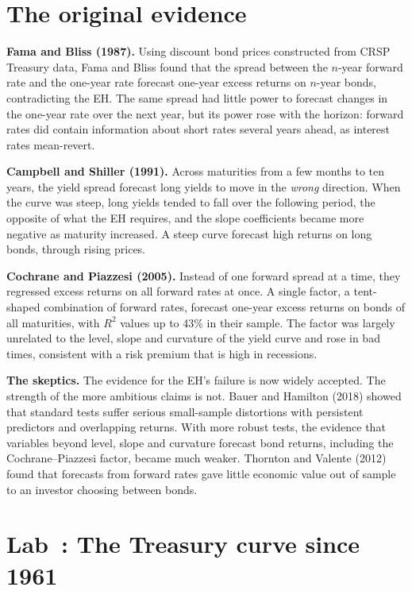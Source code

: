 \section{The original evidence}
\label{sec:10-evidence}

\textbf{Fama and Bliss (1987).} Using discount bond prices constructed from CRSP Treasury data, Fama and Bliss found that the spread between the $n$-year forward rate and the one-year rate forecast one-year excess returns on $n$-year bonds, contradicting the EH. The same spread had little power to forecast changes in the one-year rate over the next year, but its power rose with the horizon: forward rates did contain information about short rates several years ahead, as interest rates mean-revert.

\textbf{Campbell and Shiller (1991).} Across maturities from a few months to ten years, the yield spread forecast long yields to move in the \emph{wrong} direction. When the curve was steep, long yields tended to fall over the following period, the opposite of what the EH requires, and the slope coefficients became more negative as maturity increased. A steep curve forecast high returns on long bonds, through rising prices.

\textbf{Cochrane and Piazzesi (2005).} Instead of one forward spread at a time, they regressed excess returns on all forward rates at once. A single factor, a tent-shaped combination of forward rates, forecast one-year excess returns on bonds of all maturities, with $R^2$ values up to 43\% in their sample. The factor was largely unrelated to the level, slope and curvature of the yield curve and rose in bad times, consistent with a risk premium that is high in recessions.

\textbf{The skeptics.} The evidence for the EH's failure is now widely accepted. The strength of the more ambitious claims is not. Bauer and Hamilton (2018) showed that standard tests suffer serious small-sample distortions with persistent predictors and overlapping returns. With more robust tests, the evidence that variables beyond level, slope and curvature forecast bond returns, including the Cochrane--Piazzesi factor, became much weaker. Thornton and Valente (2012) found that forecasts from forward rates gave little economic value out of sample to an investor choosing between bonds.

\section{Lab~\thechapter: The Treasury curve since 1961}
\label{sec:10-lab}

